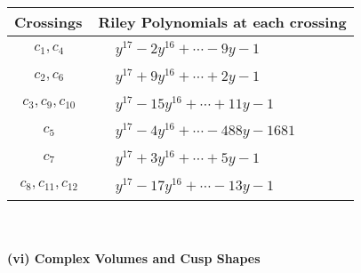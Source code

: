\documentclass[1p]{elsarticle_modified}
\theoremstyle{definition}
\begin{document}
\begin{tabular}{m{50pt}|m{274pt}}
Crossings & \hspace{64pt}Riley Polynomials at each crossing \\
\hline $$\begin{aligned}c_{1},c_{4}\end{aligned}$$&$\begin{aligned}
&y^{17}-2 y^{16}+\cdots-9 y-1
\end{aligned}$\\
\hline $$\begin{aligned}c_{2},c_{6}\end{aligned}$$&$\begin{aligned}
&y^{17}+9 y^{16}+\cdots+2 y-1
\end{aligned}$\\
\hline $$\begin{aligned}c_{3},c_{9},c_{10}\end{aligned}$$&$\begin{aligned}
&y^{17}-15 y^{16}+\cdots+11 y-1
\end{aligned}$\\
\hline $$\begin{aligned}c_{5}\end{aligned}$$&$\begin{aligned}
&y^{17}-4 y^{16}+\cdots-488 y-1681
\end{aligned}$\\
\hline $$\begin{aligned}c_{7}\end{aligned}$$&$\begin{aligned}
&y^{17}+3 y^{16}+\cdots+5 y-1
\end{aligned}$\\
\hline $$\begin{aligned}c_{8},c_{11},c_{12}\end{aligned}$$&$\begin{aligned}
&y^{17}-17 y^{16}+\cdots-13 y-1
\end{aligned}$\\
\hline
\end{tabular}\\~\\
\newpage\flushleft \textbf{(vi) Complex Volumes and Cusp Shapes}
\end{document}
